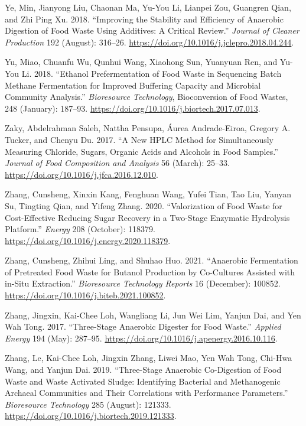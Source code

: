 \documentclass[11pt]{report}
\begin{document}
\begin{hangparas}{1.5em}{1}
\hypertarget{citeproc_bib_item_92}{Ye, Min, Jianyong Liu, Chaonan Ma, Yu-You Li, Lianpei Zou, Guangren Qian, and Zhi Ping Xu. 2018. “Improving the Stability and Efficiency of Anaerobic Digestion of Food Waste Using Additives: A Critical Review.” \textit{Journal of Cleaner Production} 192 (August): 316–26. \url{https://doi.org/10.1016/j.jclepro.2018.04.244}.}

\hypertarget{citeproc_bib_item_93}{Yu, Miao, Chuanfu Wu, Qunhui Wang, Xiaohong Sun, Yuanyuan Ren, and Yu-You Li. 2018. “Ethanol Prefermentation of Food Waste in Sequencing Batch Methane Fermentation for Improved Buffering Capacity and Microbial Community Analysis.” \textit{Bioresource Technology}, Bioconversion of Food Wastes, 248 (January): 187–93. \url{https://doi.org/10.1016/j.biortech.2017.07.013}.}

\hypertarget{citeproc_bib_item_94}{Zaky, Abdelrahman Saleh, Nattha Pensupa, Áurea Andrade-Eiroa, Gregory A. Tucker, and Chenyu Du. 2017. “A New HPLC Method for Simultaneously Measuring Chloride, Sugars, Organic Acids and Alcohols in Food Samples.” \textit{Journal of Food Composition and Analysis} 56 (March): 25–33. \url{https://doi.org/10.1016/j.jfca.2016.12.010}.}

\hypertarget{citeproc_bib_item_95}{Zhang, Cunsheng, Xinxin Kang, Fenghuan Wang, Yufei Tian, Tao Liu, Yanyan Su, Tingting Qian, and Yifeng Zhang. 2020. “Valorization of Food Waste for Cost-Effective Reducing Sugar Recovery in a Two-Stage Enzymatic Hydrolysis Platform.” \textit{Energy} 208 (October): 118379. \url{https://doi.org/10.1016/j.energy.2020.118379}.}

\hypertarget{citeproc_bib_item_96}{Zhang, Cunsheng, Zhihui Ling, and Shuhao Huo. 2021. “Anaerobic Fermentation of Pretreated Food Waste for Butanol Production by Co-Cultures Assisted with in-Situ Extraction.” \textit{Bioresource Technology Reports} 16 (December): 100852. \url{https://doi.org/10.1016/j.biteb.2021.100852}.}

\hypertarget{citeproc_bib_item_97}{Zhang, Jingxin, Kai-Chee Loh, Wangliang Li, Jun Wei Lim, Yanjun Dai, and Yen Wah Tong. 2017. “Three-Stage Anaerobic Digester for Food Waste.” \textit{Applied Energy} 194 (May): 287–95. \url{https://doi.org/10.1016/j.apenergy.2016.10.116}.}

\hypertarget{citeproc_bib_item_98}{Zhang, Le, Kai-Chee Loh, Jingxin Zhang, Liwei Mao, Yen Wah Tong, Chi-Hwa Wang, and Yanjun Dai. 2019. “Three-Stage Anaerobic Co-Digestion of Food Waste and Waste Activated Sludge: Identifying Bacterial and Methanogenic Archaeal Communities and Their Correlations with Performance Parameters.” \textit{Bioresource Technology} 285 (August): 121333. \url{https://doi.org/10.1016/j.biortech.2019.121333}.}


\end{hangparas}
\end{document}
